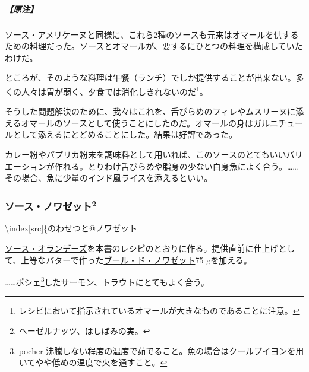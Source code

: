 \begin{recette}
\hypertarget{nota-sauce-new-burg-b}{%
\subparagraph{【原注】}\label{nota-sauce-new-burg-b}}

\protect\hyperlink{sauce-americaine}{ソース・アメリケーヌ}と同様に、これら2種のソースも元来はオマールを供するための料理だった。ソースとオマールが、要するにひとつの料理を構成していたわけだ。

ところが、そのような料理は午餐（ランチ）でしか提供することが出来ない。多くの人々は胃が弱く、夕食では消化しきれないのだ\footnote{レシピにおいて指示されているオマールが大きなものであることに注意。}。

そうした問題解決のために、我々はこれを、舌びらめのフィレやムスリーヌに添えるオマールのソースとして使うことにしたのだ。オマールの身はガルニチュールとして添えるにとどめることにした。結果は好評であった。

カレー粉やパプリカ粉末を調味料として用いれば、このソースのとてもいいバリエーションが作れる。とりわけ舌びらめや脂身の少ない白身魚によく合う。\ldots{}\ldots{}その場合、魚に少量の\protect\hyperlink{riz-indienne}{インド風ライス}を添えるといい。

\atoaki{}

\hypertarget{sauce-noisette}{%
\subsubsection[ソース・ノワゼット]{\texorpdfstring{ソース・ノワゼット\footnote{ヘーゼルナッツ、はしばみの実。}}{ソース・ノワゼット}}\label{sauce-noisette}}


 
\textbackslash{}index{[}src{]}\{のわせつと@ノワゼット

\protect\hyperlink{sauce-hollandaise}{ソース・オランデーズ}を本書のレシピのとおりに作る。提供直前に仕上げとして、上等なバターで作った\protect\hyperlink{beurre-de-noisette}{ブール・ド・ノワゼット}75
gを加える。

\ldots{}\ldots{}ポシェ\footnote{pocher
  沸騰しない程度の温度で茹でること。魚の場合は\protect\hyperlink{court-bouillon-a}{クールブイヨン}を用いてやや低めの温度で火を通すこと。}したサーモン、トラウトにとてもよく合う。

\atoaki{}

\hypertarget{sauce-normande}{%
}
\end{recette}
